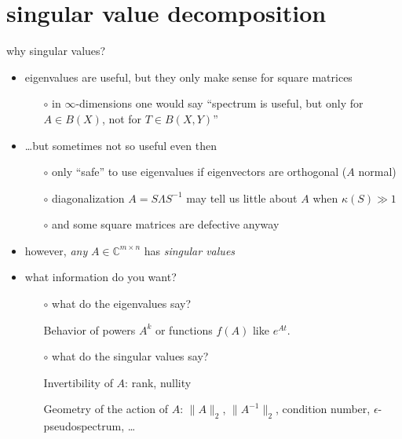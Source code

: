 \documentclass[10pt,hyperref]{beamer}
\newcommand{\CC}{\mathbb{C}}
\newcommand{\eps}{\epsilon}
\begin{document}
\section{singular value decomposition}

\begin{frame}{why singular values?}

\begin{itemize}
\item eigenvalues are useful, but they only make sense for square matrices
    \begin{itemize}
    \item[$\circ$] in $\infty$-dimensions one would say ``spectrum is useful, but only for $A\in B(X)$, not for $T \in B(X,Y)$''
    \end{itemize}
\item \dots but sometimes not so useful even then
    \begin{itemize}
    \item[$\circ$] only ``safe'' to use eigenvalues if eigenvectors are orthogonal ($A$ normal)
    \item[$\circ$] diagonalization $A=S\Lambda S^{-1}$ may tell us little about $A$ when $\kappa(S)\gg 1$
    \item[$\circ$] and some square matrices are defective anyway
    \end{itemize}
\item however, \emph{any} $A \in \CC^{m\times n}$ has \emph{singular values}
\item what information do you want?
    \begin{itemize}

\medskip
    \item[$\circ$] what do the \alert{eigenvalues} say?

\medskip
    Behavior of powers $A^k$ or functions $f(A)$ like $e^{At}$.

\medskip
    \item[$\circ$] what do the \alert{singular values} say?

\medskip
Invertibility of $A$: rank, nullity

\medskip
Geometry of the action of $A$: $\|A\|_2$, $\|A^{-1}\|_2$, condition number, $\eps$-pseudospectrum, \dots
    \end{itemize}
\end{itemize}
\end{frame}
\end{document}
